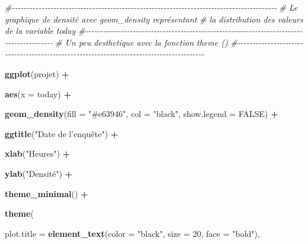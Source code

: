 \documentclass[
]{article}
\newenvironment{Shaded}{\begin{snugshade}}{\end{snugshade}}
\newcommand{\AttributeTok}[1]{\textcolor[rgb]{0.13,0.29,0.53}{#1}}
\newcommand{\CommentTok}[1]{\textcolor[rgb]{0.56,0.35,0.01}{\textit{#1}}}
\newcommand{\ConstantTok}[1]{\textcolor[rgb]{0.56,0.35,0.01}{#1}}
\newcommand{\DecValTok}[1]{\textcolor[rgb]{0.00,0.00,0.81}{#1}}
\newcommand{\FunctionTok}[1]{\textcolor[rgb]{0.13,0.29,0.53}{\textbf{#1}}}
\newcommand{\NormalTok}[1]{#1}
\newcommand{\SpecialCharTok}[1]{\textcolor[rgb]{0.81,0.36,0.00}{\textbf{#1}}}
\newcommand{\StringTok}[1]{\textcolor[rgb]{0.31,0.60,0.02}{#1}}
\begin{document}
\begin{Shaded}
\begin{Highlighting}[]
\CommentTok{\#{-}{-}{-}{-}{-}{-}{-}{-}{-}{-}{-}{-}{-}{-}{-}{-}{-}{-}{-}{-}{-}{-}{-}{-}{-}{-}{-}{-}{-}{-}{-}{-}{-}{-}{-}{-}{-}{-}{-}{-}{-}{-}{-}{-}{-}{-}{-}{-}{-}{-}{-}{-}{-}{-}{-}{-}{-}{-}{-}{-}{-}{-}{-}{-}{-}{-}{-}{-}{-}{-}{-}{-}{-}{-}{-}{-}{-}{-}{-}{-}{-}{-}{-}{-}{-}{-}{-}{-}{-}}
\CommentTok{\#  Le graphique de densité avec geom\_density représentant }
\CommentTok{\#    la distribution des valeurs de la variable today }
\CommentTok{\#{-}{-}{-}{-}{-}{-}{-}{-}{-}{-}{-}{-}{-}{-}{-}{-}{-}{-}{-}{-}{-}{-}{-}{-}{-}{-}{-}{-}{-}{-}{-}{-}{-}{-}{-}{-}{-}{-}{-}{-}{-}{-}{-}{-}{-}{-}{-}{-}{-}{-}{-}{-}{-}{-}{-}{-}{-}{-}{-}{-}{-}{-}{-}{-}{-}{-}{-}{-}{-}{-}{-}{-}{-}{-}{-}{-}{-}{-}{-}{-}{-}{-}{-}{-}{-}{-}{-}{-}{-}}
\CommentTok{\# Un peu d\textquotesingle{}esthetique avec la fonction theme ()}
\CommentTok{\#{-}{-}{-}{-}{-}{-}{-}{-}{-}{-}{-}{-}{-}{-}{-}{-}{-}{-}{-}{-}{-}{-}{-}{-}{-}{-}{-}{-}{-}{-}{-}{-}{-}{-}{-}{-}{-}{-}{-}{-}{-}{-}{-}{-}{-}{-}{-}{-}{-}{-}{-}{-}{-}{-}{-}{-}{-}{-}{-}{-}{-}{-}{-}{-}{-}{-}{-}{-}{-}{-}{-}{-}{-}{-}{-}{-}{-}{-}{-}{-}{-}{-}{-}{-}{-}{-}{-}{-}{-}}

\FunctionTok{ggplot}\NormalTok{(projet) }\SpecialCharTok{+}
  
  \FunctionTok{aes}\NormalTok{(}\AttributeTok{x =}\NormalTok{ today) }\SpecialCharTok{+}
  
  \FunctionTok{geom\_density}\NormalTok{(}\AttributeTok{fill =} \StringTok{"\#e63946"}\NormalTok{, }\AttributeTok{col =} \StringTok{"black"}\NormalTok{, }\AttributeTok{show.legend =} \ConstantTok{FALSE}\NormalTok{) }\SpecialCharTok{+}
  
  \FunctionTok{ggtitle}\NormalTok{(}\StringTok{"Date de l’enquête"}\NormalTok{) }\SpecialCharTok{+}
  
  \FunctionTok{xlab}\NormalTok{(}\StringTok{"Heures"}\NormalTok{) }\SpecialCharTok{+}
  
  \FunctionTok{ylab}\NormalTok{(}\StringTok{"Densité"}\NormalTok{) }\SpecialCharTok{+}
  
  \FunctionTok{theme\_minimal}\NormalTok{() }\SpecialCharTok{+}
  
  \FunctionTok{theme}\NormalTok{(}
    
    \AttributeTok{plot.title =} \FunctionTok{element\_text}\NormalTok{(}\AttributeTok{color =} \StringTok{"black"}\NormalTok{, }\AttributeTok{size =} \DecValTok{20}\NormalTok{, }\AttributeTok{face =} \StringTok{"bold"}\NormalTok{),  }
    

\end{Highlighting}
\end{Shaded}
\end{document}
